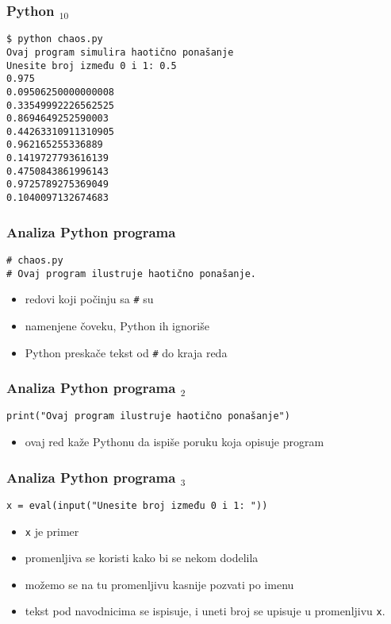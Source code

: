 \documentclass[utf8,compress,aspectratio=169]{beamer}
\begin{document}
\begin{frame}[fragile]
\frametitle{Python $_{10}$}
\begin{verbatim}
$ python chaos.py
Ovaj program simulira haotično ponašanje
Unesite broj između 0 i 1: 0.5
0.975
0.09506250000000008
0.33549992226562525
0.8694649252590003
0.44263310911310905
0.962165255336889
0.1419727793616139
0.4750843861996143
0.9725789275369049
0.1040097132674683
\end{verbatim}
\end{frame}

\begin{frame}[fragile]
\frametitle{Analiza Python programa}
\begin{verbatim}
# chaos.py
# Ovaj program ilustruje haotično ponašanje.
\end{verbatim}
\begin{itemize}
  \item redovi koji počinju sa \texttt{\#} su 
  \item namenjene čoveku, Python ih ignoriše
  \item Python preskače tekst od \texttt{\#} do kraja reda
\end{itemize}
\end{frame}

\begin{frame}[fragile]
\frametitle{Analiza Python programa $_2$}
\begin{verbatim}
print("Ovaj program ilustruje haotično ponašanje")
\end{verbatim}
\begin{itemize}
  \item ovaj red kaže Pythonu da ispiše poruku koja opisuje program
\end{itemize}
\end{frame}

\begin{frame}[fragile]
\frametitle{Analiza Python programa $_3$}
\begin{verbatim}
x = eval(input("Unesite broj između 0 i 1: "))
\end{verbatim}
\begin{itemize}
  \item \texttt{x} je primer 
  \item promenljiva se koristi kako bi se nekom  dodelila 
  \item možemo se na tu promenljivu kasnije pozvati po imenu
  \item tekst pod navodnicima se ispisuje, i uneti broj se upisuje u promenljivu \texttt{x}.
\end{itemize}
\end{frame}
\end{document}
